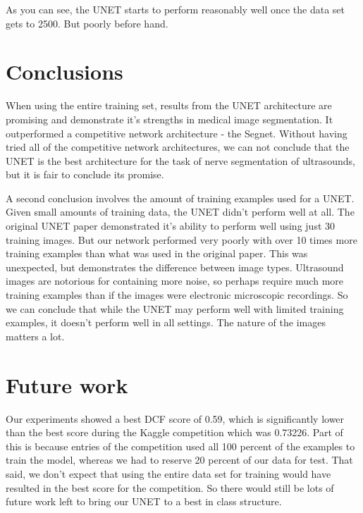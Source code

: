 \documentclass[letterpaper]{article}
\begin{document}
As you can see, the UNET starts to perform reasonably well once the data set gets to 2500. But poorly before hand. 

\section{Conclusions}
When using the entire training set, results from the UNET architecture are promising and demonstrate it's strengths in medical image segmentation. It outperformed a competitive network architecture - the Segnet. Without having tried all of the competitive network architectures, we can not conclude that the UNET is the best architecture for the task of nerve segmentation of ultrasounds, but it is fair to conclude its promise. 

A second conclusion involves the amount of training examples used for a UNET. Given small amounts of training data, the UNET didn't perform well at all. The original UNET paper demonstrated it's ability to perform well using just 30 training images. But our network performed very poorly with over 10 times more training examples than what was used in the original paper. This was unexpected, but demonstrates the difference between image types. Ultrasound images are notorious for containing more noise, so perhaps require much more training examples than if the images were electronic microscopic recordings. So we can conclude that while the UNET may perform well with limited training examples, it doesn't perform well in all settings. The nature of the images matters a lot.

\section{Future work}
Our experiments showed a best DCF score of 0.59, which is significantly lower than the best score during the Kaggle competition which was 0.73226. Part of this is because entries of the competition used all 100 percent of the examples to train the model, whereas we had to reserve 20 percent of our data for test. That said, we don't expect that using the entire data set for training would have resulted in the best score for the competition. So there would still be lots of future work left to bring our UNET to a best in class structure. 
\end{document}
